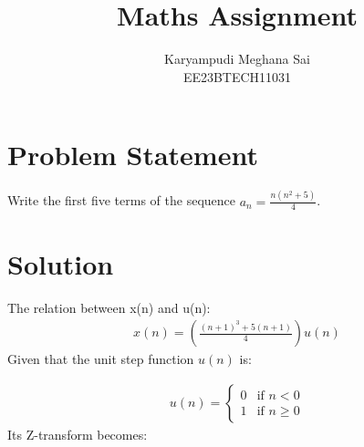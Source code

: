 \documentclass{article}
\begin{document}
\title{Maths Assignment}
\author{Karyampudi Meghana Sai\\ EE23BTECH11031}
\maketitle

\section*{Problem Statement}
Write the first five terms of the sequence \(a_n = \frac{n(n^2+5)}{4}\).

\section*{Solution}


The relation between x(n) and u(n):
\begin{align}
 x(n) = \left(\frac{(n+1)^3+5(n+1)}{4}\right) u(n)
 \end{align}
 Given that the unit step function \(u(n)\) is:

\begin{align} 
u(n) = \begin{cases} 0 & \text{if } n < 0 \\ 1 & \text{if } n \geq 0 \end{cases}
 \end{align}
Its Z-transform becomes:
\end{document}
